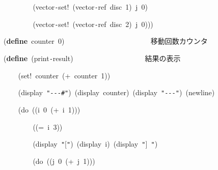 \documentclass[a4paper,10pt]{article}
\def\mc{\relax}
\begin{document}
\noindent
\mbox{}{\tt\mc \ }{\tt\mc \ }{\tt\mc \ }{\tt\mc \ }{\tt\mc \ }{\tt\mc \ }{\tt\mc \ }{\tt\mc \ }(vector{\tt -}set!{\tt\mc \ }(vector{\tt -}ref{\tt\mc \ }disc{\tt\mc \ }1){\tt\mc \ }j{\tt\mc \ }0)

\noindent
\mbox{}{\tt\mc \ }{\tt\mc \ }{\tt\mc \ }{\tt\mc \ }{\tt\mc \ }{\tt\mc \ }{\tt\mc \ }{\tt\mc \ }(vector{\tt -}set!{\tt\mc \ }(vector{\tt -}ref{\tt\mc \ }disc{\tt\mc \ }2){\tt\mc \ }j{\tt\mc \ }0)))

\noindent
\mbox{}\hfill

\noindent
\mbox{}(\textbf{define}{\tt\mc \ }counter{\tt\mc \ }0){\tt\mc \ }{\tt\mc \ }{\tt\mc \ }{\tt\mc \ }{\tt\mc \ }{\tt\mc \ }{\tt\mc \ }{\tt\mc \ }{\tt\mc \ }{\tt\mc \ }{\tt\mc \ }{\tt\mc \ }{\tt\mc \ }{\tt\mc \ }{\tt\mc \ }{\tt\mc \ }{\tt\mc \ }{\tt\mc \ }{\tt\mc \ }{\tt\mc \ }{\tt\mc \ }{\tt\mc \ }\rm\mc {\tt ;} \ 移動回数カウンタ \hfill
\tt\mc 

\noindent
\mbox{}\hfill

\noindent
\mbox{}(\textbf{define}{\tt\mc \ }(print{\tt -}result){\tt\mc \ }{\tt\mc \ }{\tt\mc \ }{\tt\mc \ }{\tt\mc \ }{\tt\mc \ }{\tt\mc \ }{\tt\mc \ }{\tt\mc \ }{\tt\mc \ }{\tt\mc \ }{\tt\mc \ }{\tt\mc \ }{\tt\mc \ }{\tt\mc \ }{\tt\mc \ }{\tt\mc \ }{\tt\mc \ }\rm\mc {\tt ;} \ 結果の表示 \hfill
\tt\mc 

\noindent
\mbox{}{\tt\mc \ }{\tt\mc \ }{\tt\mc \ }{\tt\mc \ }(set!{\tt\mc \ }counter{\tt\mc \ }(+{\tt\mc \ }counter{\tt\mc \ }1))

\noindent
\mbox{}{\tt\mc \ }{\tt\mc \ }{\tt\mc \ }{\tt\mc \ }(display{\tt\mc \ }{\tt "}{\tt -}{\tt -}{\tt -}{\tt\#}{\tt "}){\tt\mc \ }(display{\tt\mc \ }counter){\tt\mc \ }(display{\tt\mc \ }{\tt "}{\tt -}{\tt -}{\tt -}{\tt "}){\tt\mc \ }(newline)

\noindent
\mbox{}{\tt\mc \ }{\tt\mc \ }{\tt\mc \ }{\tt\mc \ }(do{\tt\mc \ }((i{\tt\mc \ }0{\tt\mc \ }(+{\tt\mc \ }i{\tt\mc \ }1)))

\noindent
\mbox{}{\tt\mc \ }{\tt\mc \ }{\tt\mc \ }{\tt\mc \ }{\tt\mc \ }{\tt\mc \ }{\tt\mc \ }{\tt\mc \ }((={\tt\mc \ }i{\tt\mc \ }3))

\noindent
\mbox{}{\tt\mc \ }{\tt\mc \ }{\tt\mc \ }{\tt\mc \ }{\tt\mc \ }{\tt\mc \ }{\tt\mc \ }{\tt\mc \ }(display{\tt\mc \ }{\tt "}[{\tt "}){\tt\mc \ }(display{\tt\mc \ }i){\tt\mc \ }(display{\tt\mc \ }{\tt "}]{\tt\mc \ }{\tt "})

\noindent
\mbox{}{\tt\mc \ }{\tt\mc \ }{\tt\mc \ }{\tt\mc \ }{\tt\mc \ }{\tt\mc \ }{\tt\mc \ }{\tt\mc \ }(do{\tt\mc \ }((j{\tt\mc \ }0{\tt\mc \ }(+{\tt\mc \ }j{\tt\mc \ }1)))
\end{document}
